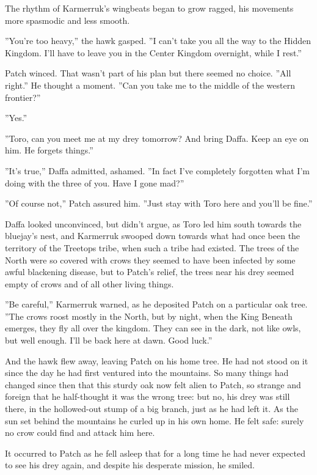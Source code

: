 \documentclass[12pt]{book}
\begin{document}
The rhythm of Karmerruk's wingbeats began to grow ragged, his movements more spasmodic and less smooth.

''You're too heavy,'' the hawk gasped. ''I can't take you all the way to the Hidden Kingdom. I'll have to leave you in the Center Kingdom overnight, while I rest.''

Patch winced. That wasn't part of his plan %
but there seemed no choice. ''All right.'' He thought a moment. ''Can you take me to the middle of the western frontier?''

''Yes.''

''Toro, can you meet me at my drey tomorrow? And bring Daffa. Keep an eye on him. He forgets things.''

''It's true,'' Daffa admitted, ashamed. ''In fact I've completely forgotten what I'm doing with the three of you. Have I gone mad?''

''Of course not,'' Patch assured him. ''Just stay with Toro here and you'll be fine.''

Daffa looked unconvinced, but didn't argue, as Toro led him south towards the bluejay's nest, and Karmerruk swooped down towards what had once been the territory of the Treetops tribe, when such a tribe had existed. The trees of the North were so covered with crows they seemed to have been infected by some awful blackening disease, but to Patch's relief, the trees near his drey seemed empty of crows %
and of all other living things.

''Be careful,'' Karmerruk warned, as he deposited Patch on a particular oak tree. ''The crows roost mostly in the North, but by night, when the King Beneath emerges, they fly all over the kingdom. They can see in the dark, not like owls, but well enough. I'll be back here at dawn. Good luck.''

And the hawk flew away, leaving Patch on his home tree. He had not stood on it since the day he had first ventured into the mountains. So many things had changed since then that this sturdy oak now felt alien to Patch, so strange and foreign that he half-thought it was the wrong tree: but no, his drey was still there, in the hollowed-out stump of a big branch, just as he had left it. As the sun set behind the mountains he curled up in his own home. He felt safe: surely no crow could find and attack him here.

It occurred to Patch as he fell asleep that for a long time he had never expected to see his drey again, and despite his desperate mission, he smiled.
\end{document}

